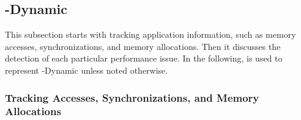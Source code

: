 \begin{comment}

To intercept memory access instructions, The function call is implemented by \NP{}, through which \NP{} could intercept each memory access operation from target applications with its address and access type(read or write).

It is worth to note that \NP{} only focused on memory access to heap objects and global objects, since they have much higher chance to be shared for multiple threads, which leads potential NUMA issues. If an object is only accessed by one single thread, it will never cause performance issues, unless threads migrated to another nodes and \NP{} could also detect this problem that is detailed described in the following parts.Besides, the pass function should be placed at the very end of compiling optimization phase of LLVM, since most memory access instructions will be optimized out after huge amounts of compiling optimization strategies applied by LLVM. Based on our experiments, the number of memory access instructions could be reduce by half or more.So if the order of the pass function is not set properly, huge amounts of duplicated instrumentation calls will be made which not only brings more overheads but also makes the profiling results not accurate.

\end{comment}



\subsection{\NP{}-Dynamic}

This subsection starts with tracking application information, such as memory accesses, synchronizations, and memory allocations. Then it discusses the detection of each particular performance issue.  In the following, \NP{} is used to represent \NP{}-Dynamic unless noted otherwise. 

\subsubsection{Tracking Accesses, Synchronizations, and Memory Allocations}

